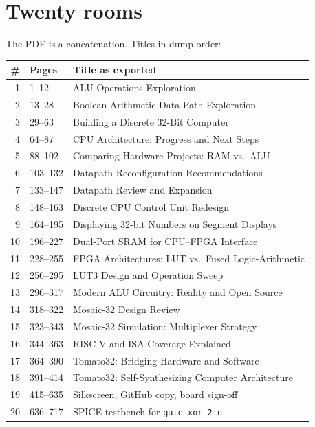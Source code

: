 \documentclass[11pt,openany]{book}
\begin{document}
\chapter{Twenty rooms}

The PDF is a concatenation. Titles in dump order:

\begin{center}
\small
\begin{tabular}{@{}rlp{7.6cm}@{}}
\toprule
\# & Pages & Title as exported \\
\midrule
1  & 1--12   & ALU Operations Exploration \\
2  & 13--28  & Boolean-Arithmetic Data Path Exploration \\
3  & 29--63  & Building a Discrete 32-Bit Computer \\
4  & 64--87  & CPU Architecture: Progress and Next Steps \\
5  & 88--102 & Comparing Hardware Projects: RAM vs.\ ALU \\
6  & 103--132 & Datapath Reconfiguration Recommendations \\
7  & 133--147 & Datapath Review and Expansion \\
8  & 148--163 & Discrete CPU Control Unit Redesign \\
9  & 164--195 & Displaying 32-bit Numbers on Segment Displays \\
10 & 196--227 & Dual-Port SRAM for CPU--FPGA Interface \\
11 & 228--255 & FPGA Architectures: LUT vs.\ Fused Logic-Arithmetic \\
12 & 256--295 & LUT3 Design and Operation Sweep \\
13 & 296--317 & Modern ALU Circuitry: Reality and Open Source \\
14 & 318--322 & Mosaic-32 Design Review \\
15 & 323--343 & Mosaic-32 Simulation: Multiplexer Strategy \\
16 & 344--363 & RISC-V and ISA Coverage Explained \\
17 & 364--390 & Tomato32: Bridging Hardware and Software \\
18 & 391--414 & Tomato32: Self-Synthesizing Computer Architecture \\
19 & 415--635 & Silkscreen, GitHub copy, board sign-off \\
20 & 636--717 & SPICE testbench for \texttt{gate\_xor\_2in} \\
\bottomrule
\end{tabular}
\end{center}
\end{document}
